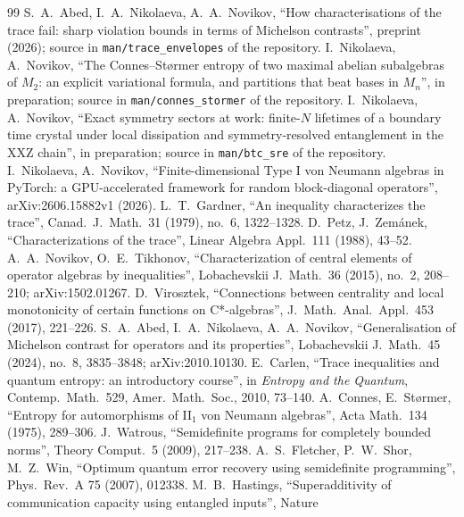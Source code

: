 \documentclass[11pt]{article}
\begin{document}
\appendix
{\sloppy\small
\begin{thebibliography}{99}\setlength{\itemsep}{1pt}
 S.~A.~Abed, I.~A.~Nikolaeva, A.~A.~Novikov, ``How characterisations of the trace fail: sharp
  violation bounds in terms of Michelson contrasts'', preprint (2026); source in \texttt{man/trace\_envelopes} of the
  repository.
 I.~Nikolaeva, A.~Novikov, ``The Connes--St{\o}rmer entropy of two maximal abelian subalgebras of $M_2$:
  an explicit variational formula, and partitions that beat bases in $M_n$'', in preparation; source in
  \texttt{man/connes\_stormer} of the repository.
 I.~Nikolaeva, A.~Novikov, ``Exact symmetry sectors at work: finite-$N$ lifetimes of a boundary time
  crystal under local dissipation and symmetry-resolved entanglement in the XXZ chain'', in preparation; source in
  \texttt{man/btc\_sre} of the repository.
 I.~Nikolaeva, A.~Novikov, ``Finite-dimensional Type I von Neumann algebras in PyTorch: a
  GPU-accelerated framework for random block-diagonal operators'', arXiv:2606.15882v1 (2026).
 L.~T.~Gardner, ``An inequality characterizes the trace'', Canad.\ J.\ Math.\ 31
  (1979), no.~6, 1322--1328.
 D.~Petz, J.~Zem\'anek, ``Characterizations of the trace'', Linear Algebra Appl.\ 111
  (1988), 43--52.
 A.~A.~Novikov, O.~E.~Tikhonov, ``Characterization of central elements of operator
  algebras by inequalities'', Lobachevskii J.\ Math.\ 36 (2015), no.~2, 208--210; arXiv:1502.01267.
 D.~Virosztek, ``Connections between centrality and local monotonicity of certain
  functions on C*-algebras'', J.\ Math.\ Anal.\ Appl.\ 453 (2017), 221--226.
 S.~A.~Abed, I.~A.~Nikolaeva, A.~A.~Novikov, ``Generalisation of Michelson contrast for
  operators and its properties'', Lobachevskii J.\ Math.\ 45 (2024), no.~8, 3835--3848; arXiv:2010.10130.
 E.~Carlen, ``Trace inequalities and quantum entropy: an introductory course'', in
  \emph{Entropy and the Quantum}, Contemp.\ Math.\ 529, Amer.\ Math.\ Soc., 2010, 73--140.
 A.~Connes, E.~St{\o}rmer, ``Entropy for automorphisms of II$_1$ von Neumann algebras'', Acta
  Math.\ 134 (1975), 289--306.
 J.~Watrous, ``Semidefinite programs for completely bounded norms'', Theory Comput.\ 5 (2009),
  217--238.
 A.~S.~Fletcher, P.~W.~Shor, M.~Z.~Win, ``Optimum quantum error recovery using semidefinite
  programming'', Phys.\ Rev.\ A 75 (2007), 012338.
 M.~B.~Hastings, ``Superadditivity of communication capacity using entangled inputs'', Nature

\end{thebibliography}}
\end{document}
